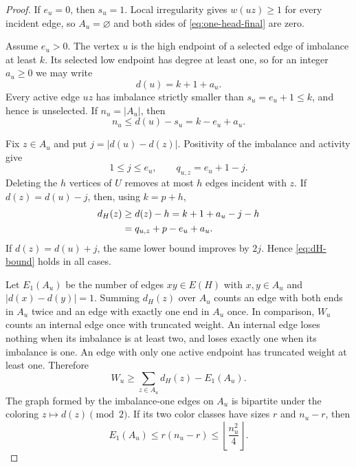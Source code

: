 \documentclass[a4paper,11pt]{amsart}
\numberwithin{equation}{section}
\theoremstyle{definition}
\theoremstyle{remark}
\begin{document}
\begin{proof}
If $e_u=0$, then $s_u=1$.  Local irregularity gives $w(uz)\ge1$ for every incident edge, so $A_u=\varnothing$ and both sides of \eqref{eq:one-head-final} are zero.

Assume $e_u>0$.  The vertex $u$ is the high endpoint of a selected edge of imbalance at least $k$.  Its selected low endpoint has degree at least one, so for an integer $a_u\ge0$ we may write
\begin{equation}
d(u)=k+1+a_u.
\label{eq:def-au}
\end{equation}
Every active edge $uz$ has imbalance strictly smaller than $s_u=e_u+1\le k$, and hence is unselected.  If $n_u=\lvert A_u\rvert$, then
\begin{equation}
n_u\le d(u)-s_u=k-e_u+a_u.
\label{eq:n-bound}
\end{equation}

Fix $z\in A_u$ and put $j=\lvert d(u)-d(z)\rvert$.  Positivity of the imbalance and activity give
\begin{equation}
1\le j\le e_u,
\qquad
q_{u,z}=e_u+1-j.
\label{eq:j-q}
\end{equation}
Deleting the $h$ vertices of $U$ removes at most $h$ edges incident with $z$.  If $d(z)=d(u)-j$, then, using $k=p+h$,
\begin{align}
d_H(z)
&\ge d(z)-h
 =k+1+a_u-j-h\notag\\
&=q_{u,z}+p-e_u+a_u.
\label{eq:dH-bound}
\end{align}
If $d(z)=d(u)+j$, the same lower bound improves by $2j$.  Hence \eqref{eq:dH-bound} holds in all cases.

Let $E_1(A_u)$ be the number of edges $xy\in E(H)$ with $x,y\in A_u$ and $\lvert d(x)-d(y)\rvert=1$.  Summing $d_H(z)$ over $A_u$ counts an edge with both ends in $A_u$ twice and an edge with exactly one end in $A_u$ once.  In comparison, $W_u$ counts an internal edge once with truncated weight.  An internal edge loses nothing when its imbalance is at least two, and loses exactly one when its imbalance is one.  An edge with only one active endpoint has truncated weight at least one.  Therefore
\begin{equation}
W_u\ge\sum_{z\in A_u}d_H(z)-E_1(A_u).
\label{eq:W-incidence}
\end{equation}
The graph formed by the imbalance-one edges on $A_u$ is bipartite under the coloring $z\mapsto d(z)\pmod 2$.  If its two color classes have sizes $r$ and $n_u-r$, then
\begin{equation}
E_1(A_u)\le r(n_u-r)\le\left\lfloor\frac{n_u^2}{4}\right\rfloor.
\label{eq:unit-Mantel}
\end{equation}


\end{proof}
\end{document}
